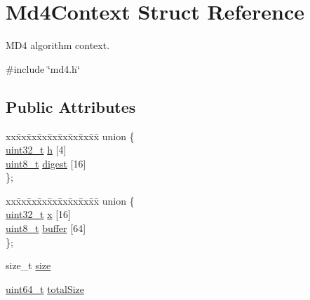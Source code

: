 \hypertarget{structMd4Context}{}\section{Md4\+Context Struct Reference}
\label{structMd4Context}


M\+D4 algorithm context.  




{\ttfamily \#include \char`\"{}md4.\+h\char`\"{}}

\subsection*{Public Attributes}
\begin{DoxyCompactItemize}
\item 
\begin{tabbing}
xx\=xx\=xx\=xx\=xx\=xx\=xx\=xx\=xx\=\kill
union \{\\
\>\hyperlink{stdint_8h_a435d1572bf3f880d55459d9805097f62}{uint32\_t} \hyperlink{structMd4Context_ab6a8fb9f73f48392e40c069e43af33c1}{h} \mbox{[}4\mbox{]}\\
\>\hyperlink{stdint_8h_aba7bc1797add20fe3efdf37ced1182c5}{uint8\_t} \hyperlink{structMd4Context_a20d72c6b9df675ac808b1e94fbeac522}{digest} \mbox{[}16\mbox{]}\\
\}; \\

\end{tabbing}\item 
\begin{tabbing}
xx\=xx\=xx\=xx\=xx\=xx\=xx\=xx\=xx\=\kill
union \{\\
\>\hyperlink{stdint_8h_a435d1572bf3f880d55459d9805097f62}{uint32\_t} \hyperlink{structMd4Context_a92e939d79039860f83c5245e8e6363e8}{x} \mbox{[}16\mbox{]}\\
\>\hyperlink{stdint_8h_aba7bc1797add20fe3efdf37ced1182c5}{uint8\_t} \hyperlink{structMd4Context_a147578f591978c41d6852388aa6f9550}{buffer} \mbox{[}64\mbox{]}\\
\}; \\

\end{tabbing}\item 
size\+\_\+t \hyperlink{structMd4Context_acdaf9c8b63010710962be1805b42e703}{size}
\item 
\hyperlink{stdint_8h_aec6fcb673ff035718c238c8c9d544c47}{uint64\+\_\+t} \hyperlink{structMd4Context_a16bb74c444bc226e324b473afd9a7c60}{total\+Size}
\end{DoxyCompactItemize}


